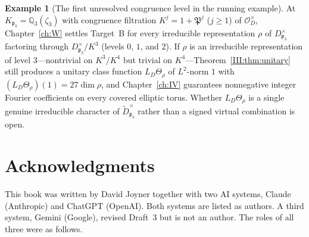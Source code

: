 \documentclass[12pt,letterpaper,oneside]{book}
\theoremstyle{plain}
\theoremstyle{definition}
\newtheorem{example}[theorem]{Example}
\begin{document}
\begin{example}[The first unresolved congruence level in the running example]\label{ex:open-level3}
At $K_{\mathfrak p_3}=\mathbb Q_3(\zeta_3)$ with congruence filtration $K^j = 1+\mathfrak P^j$ ($j\ge 1$) of $\mathcal O_D^\times$, Chapter~\ref{ch:W} settles Target~B for every irreducible representation $\rho$ of $D_{\mathfrak p_3}^\times$ factoring through $D_{\mathfrak p_3}^\times/K^3$ (levels $0$, $1$, and $2$). If $\rho$ is an irreducible representation of level $3$---nontrivial on $K^3/K^4$ but trivial on $K^4$---Theorem~\ref{III:thm:unitary} still produces a unitary class function $L_D\Theta_\rho$ of $L^2$-norm $1$ with $(L_D\Theta_\rho)(1)=27\dim\rho$, and Chapter~\ref{ch:IV} guarantees nonnegative integer Fourier coefficients on every covered elliptic torus. Whether $L_D\Theta_\rho$ is a single genuine irreducible character of $\widetilde D_{\mathfrak p_3}^\times$ rather than a signed virtual combination is open.
\end{example}











\appendix


\backmatter
\chapter{Acknowledgments}\label{ch:ack}
This book was written by David Joyner together with two AI systems,
Claude (Anthropic) and ChatGPT (OpenAI). Both systems are listed as
authors. A third system, Gemini (Google), revised Draft~3 but is not an
author. The roles of all three were as follows.
\end{document}
